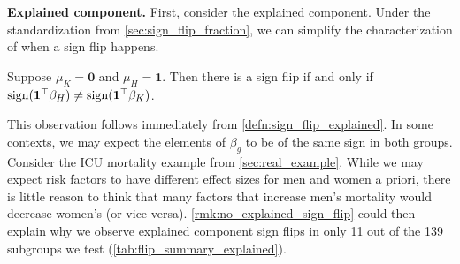 


\textbf{Explained component.} First, consider the explained component. Under the standardization from \cref{sec:sign_flip_fraction},
we can simplify the characterization of when a sign flip happens.
%
\begin{remark} \label{rmk:no_explained_sign_flip}
	Suppose $\mu_K = \mathbf{0}$ and $\mu_H = \mathbf{1}$.
	Then there is a sign flip if and only if $\operatorname{sign} (\mathbf{1}^\top \beta_{H}) \neq \operatorname{sign}( \mathbf{1}^\top \beta_{K})$.
\end{remark}
%
This observation follows immediately from \cref{defn:sign_flip_explained}.
In some contexts, we may expect the elements of $\beta_g$ to be of the same sign in both groups.
Consider the ICU mortality example from \cref{sec:real_example}.
While we may expect risk factors to have different effect sizes for men and women a priori, there is little reason to think that many factors that increase men's mortality would decrease women's (or vice versa).
\cref{rmk:no_explained_sign_flip} could then explain why we observe explained component sign flips in only 11 out of the 139 subgroups we test (\cref{tab:flip_summary_explained}).

